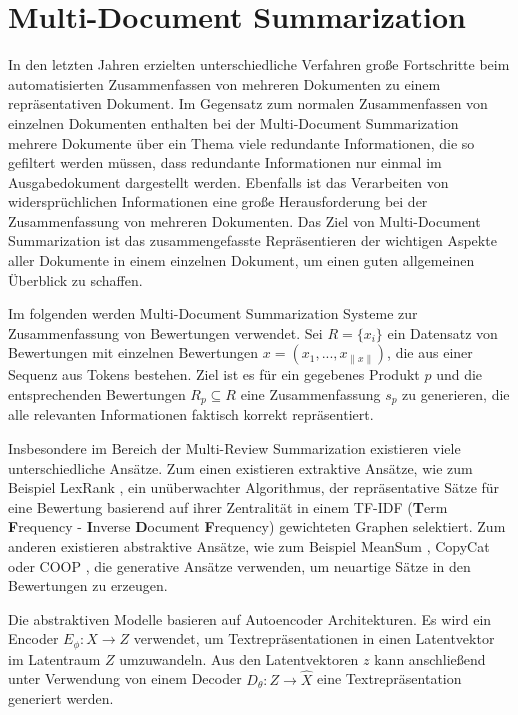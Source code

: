 \section{Multi-Document Summarization}
\label{multisum}
In den letzten Jahren erzielten unterschiedliche Verfahren große Fortschritte beim automatisierten Zusammenfassen von mehreren Dokumenten zu einem repräsentativen Dokument.
Im Gegensatz zum normalen Zusammenfassen von einzelnen Dokumenten enthalten bei der Multi-Document Summarization mehrere Dokumente über ein Thema viele redundante Informationen, die so gefiltert werden müssen, dass redundante Informationen nur einmal im Ausgabedokument dargestellt werden.
Ebenfalls ist das Verarbeiten von widersprüchlichen Informationen eine große Herausforderung bei der Zusammenfassung von mehreren Dokumenten.
Das Ziel von Multi-Document Summarization ist das zusammengefasste Repräsentieren der wichtigen Aspekte aller Dokumente in einem einzelnen Dokument, um einen guten allgemeinen Überblick zu schaffen.

Im folgenden werden Multi-Document Summarization Systeme zur Zusammenfassung von Bewertungen verwendet.
Sei $R= \{x_i \}$ ein Datensatz von Bewertungen mit einzelnen Bewertungen $x=(x_1,...,x_{\| x \|})$, die aus einer Sequenz aus Tokens bestehen.
Ziel ist es für ein gegebenes Produkt $p$ und die entsprechenden Bewertungen $R_p \subseteq R$ eine Zusammenfassung $s_p$ zu generieren, die alle relevanten Informationen faktisch korrekt repräsentiert.


Insbesondere im Bereich der Multi-Review Summarization existieren viele unterschiedliche Ansätze.
Zum einen existieren extraktive Ansätze, wie zum Beispiel LexRank \citep{lexrank}, ein unüberwachter Algorithmus, der repräsentative Sätze für eine Bewertung basierend auf ihrer Zentralität in einem TF-IDF (\textbf{T}erm \textbf{F}requency - \textbf{I}nverse \textbf{D}ocument \textbf{F}requency) \citep{tfidf} gewichteten Graphen selektiert.
Zum anderen existieren abstraktive Ansätze, wie zum Beispiel MeanSum \citep{meansum}, CopyCat \citep{copycat} oder COOP \citep{coop}, die generative Ansätze verwenden, um neuartige Sätze in den Bewertungen zu erzeugen.

Die abstraktiven Modelle basieren auf Autoencoder Architekturen. Es wird ein Encoder $E_\phi : X \rightarrow Z$ verwendet, um Textrepräsentationen in einen Latentvektor im Latentraum $Z$ umzuwandeln.
Aus den Latentvektoren $z$ kann anschließend unter Verwendung von einem Decoder $D_\theta : Z \rightarrow \hat{X}$ eine Textrepräsentation generiert werden.


